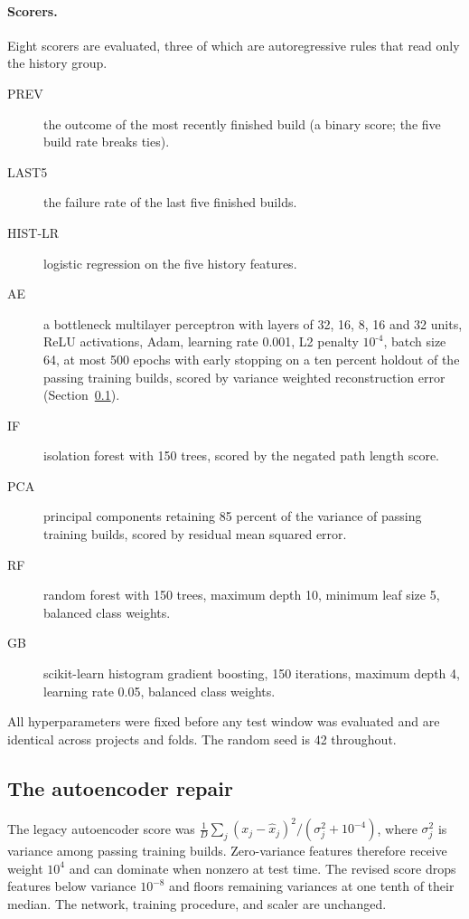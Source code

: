 \documentclass[sigconf,review,anonymous,nonacm]{acmart}
\newcommand{\mns}{\text{-}}
\begin{document}
\paragraph{Scorers.} Eight scorers are evaluated, three of which are autoregressive rules that read only the history group.
\begin{description}
  \item[PREV] the outcome of the most recently finished build (a binary score; the five build rate breaks ties).
  \item[LAST5] the failure rate of the last five finished builds.
  \item[HIST-LR] logistic regression on the five history features.
  \item[AE] a bottleneck multilayer perceptron with layers of 32, 16, 8, 16 and 32 units, ReLU activations, Adam, learning rate 0.001, L2 penalty $10^{\mns 4}$, batch size 64, at most 500 epochs with early stopping on a ten percent holdout of the passing training builds, scored by variance weighted reconstruction error (Section~\ref{sec:design-ae}).
  \item[IF] isolation forest with 150 trees, scored by the negated path length score.
  \item[PCA] principal components retaining 85 percent of the variance of passing training builds, scored by residual mean squared error.
  \item[RF] random forest with 150 trees, maximum depth 10, minimum leaf size 5, balanced class weights.
  \item[GB] scikit-learn histogram gradient boosting, 150 iterations, maximum depth 4, learning rate 0.05, balanced class weights.
\end{description}
All hyperparameters were fixed before any test window was evaluated and are identical across projects and folds. The random seed is 42 throughout.

\subsection{The autoencoder repair}
\label{sec:design-ae}

The legacy autoencoder score was $\frac{1}{D}\sum_j (x_j-\hat{x}_j)^2/(\sigma_j^2+10^{-4})$, where $\sigma_j^2$ is variance among passing training builds. Zero-variance features therefore receive weight $10^4$ and can dominate when nonzero at test time. The revised score drops features below variance $10^{-8}$ and floors remaining variances at one tenth of their median. The network, training procedure, and scaler are unchanged.
\end{document}
